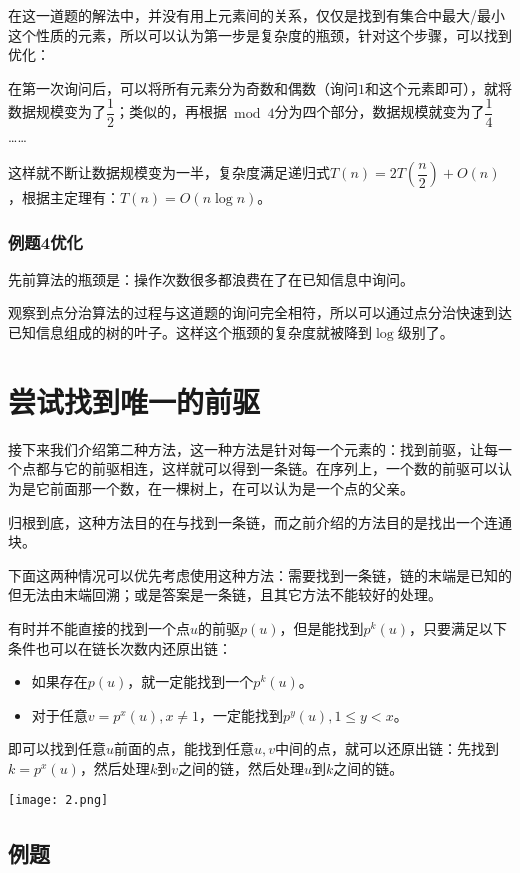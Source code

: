 \documentclass{noithesis}
\begin{document}
在这一道题的解法中，并没有用上元素间的关系，仅仅是找到有集合中最大/最小这个性质的元素，所以可以认为第一步是复杂度的瓶颈，针对这个步骤，可以找到优化：

在第一次询问后，可以将所有元素分为奇数和偶数（询问$1$和这个元素即可），就将数据规模变为了$\dfrac 12$；类似的，再根据$\bmod 4$分为四个部分，数据规模就变为了$\dfrac 14$……

这样就不断让数据规模变为一半，复杂度满足递归式$T(n)=2T(\dfrac n2)+O(n)$，根据主定理有：$T(n)=O(n\log n)$。

\subsubsection{例题4优化}

先前算法的瓶颈是：操作次数很多都浪费在了在已知信息中询问。

观察到点分治算法的过程与这道题的询问完全相符，所以可以通过点分治快速到达已知信息组成的树的叶子。这样这个瓶颈的复杂度就被降到$\log$级别了。

\section{尝试找到唯一的前驱}

接下来我们介绍第二种方法，这一种方法是针对每一个元素的：找到前驱，让每一个点都与它的前驱相连，这样就可以得到一条链。在序列上，一个数的前驱可以认为是它前面那一个数，在一棵树上，在可以认为是一个点的父亲。

归根到底，这种方法目的在与找到一条链，而之前介绍的方法目的是找出一个连通块。

下面这两种情况可以优先考虑使用这种方法：需要找到一条链，链的末端是已知的但无法由末端回溯；或是答案是一条链，且其它方法不能较好的处理。

有时并不能直接的找到一个点$u$的前驱$p(u)$，但是能找到$p^{k}(u)$，只要满足以下条件也可以在链长次数内还原出链：

\begin{itemize}
	\item 如果存在$p(u)$，就一定能找到一个$p^k(u)$。
	\item 对于任意$v=p^x(u),x\not=1$，一定能找到$p^y(u),1\le y<x$。
\end{itemize}

即可以找到任意$u$前面的点，能找到任意$u,v$中间的点，就可以还原出链：先找到$k=p^x(u)$，然后处理$k$到$v$之间的链，然后处理$u$到$k$之间的链。

\texttt{[image: 2.png]}

\subsection{例题}
\end{document}
